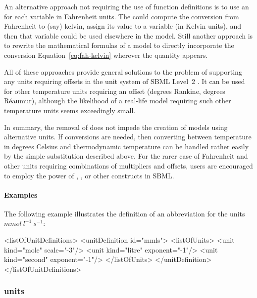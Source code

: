 \begin{itemize}
  An alternative approach not requiring the use of function
  definitions is to use an \AssignmentRule for each variable in
  Fahrenheit units.  The \AssignmentRule could compute the
  conversion from Fahrenheit to (say) kelvin, assign its value to
  a variable (in Kelvin units), and then that variable could be
  used elsewhere in the model.  Still another approach is to
  rewrite the mathematical formulas of a model to directly
  incorporate the conversion Equation~\ref{eq:fah-kelvin} wherever
  the quantity appears.

  All of these approaches provide general solutions to the problem
  of supporting any units requiring offsets in the unit system of
  SBML Level~2 .  It can be used for other temperature units
  requiring an offset (\eg degrees Rankine, degrees R\'{e}aumur),
  although the likelihood of a real-life model requiring such
  other temperature units seems exceedingly small.

\end{itemize}

In summary, the removal of  does not
impede the creation of models using alternative units.  If
conversions are needed, then converting between temperature in
degrees Celsius and thermodynamic temperature can be handled
rather easily by the simple substitution described above.  For the
rarer case of Fahrenheit and other units requiring combinations of
multipliers and offsets, users are encouraged to employ the power
of \FunctionDefinition, \AssignmentRule, or other constructs in
SBML.


\paragraph{Examples}

The following example illustrates the definition of an
abbreviation  for the units $mmol\ l^{-1}\ s^{-1}$:

\begin{example}
<listOfUnitDefinitions>
    <unitDefinition id="mmls">
        <listOfUnits>
            <unit kind="mole"   scale="-3"/>
            <unit kind="litre"  exponent="-1"/>
            <unit kind="second" exponent="-1"/>
        </listOfUnits>
    </unitDefinition>
</listOfUnitDefinitions>
\end{example}


\subsubsection{ units}
\label{sec:predefined-units}

